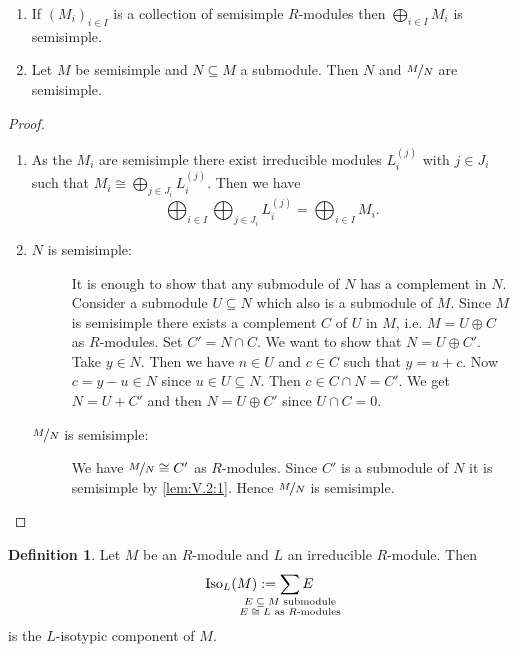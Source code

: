 \documentclass[12pt,a4paper]{scrartcl}
\theoremstyle{cplain}
\theoremstyle{cplain}
\theoremstyle{cplain}
\theoremstyle{definition}
\newtheorem*{deff}{Definition}
\begin{document}
\begin{otherlanguage}{english}
\begin{lem} \label{lem:V.2}
  \leavevmode
  \begin{enumerate}
    \item If $(M_i)_{i\in I}$ is a collection of semisimple $R$-modules then $\bigoplus_{i\in I}M_i$ is semisimple. \label{lem:V.2:1}
    \item Let $M$ be semisimple and $N\subseteq M$ a submodule. Then $N$ and $\nicefrac{M}{N}$ are semisimple. \label{lem:V.2:2}
  \end{enumerate}
\end{lem}
\begin{proof}
  \leavevmode
  \begin{enumerate}[label=\ref{lem:V.2:\arabic*}]
    \item As the $M_i$ are semisimple there exist irreducible modules $L_i^{(j)}$ with $j \in J_i$ such that $M_i \cong \bigoplus_{j\in J_i}L_i^{(j)}$. Then we have \[\bigoplus_{i\in I}\bigoplus_{j\in J_i}L_i^{(j)} = \bigoplus_{i\in I} M_i.\]
    
    \vspace{-1cm}
    \item \begin{description}
      \item[$N$ is semisimple:] It is enough to show that any submodule of $N$ has a complement in $N$. Consider a submodule $U\subseteq N$ which also is a submodule of $M$. Since $M$ is semisimple there exists a complement $C$ of $U$ in $M$, i.e. $M= U \oplus C$ as $R$-modules. Set $C' = N\cap C$. We want to show that $N=U \oplus C'$. Take $y \in N$. Then we have $n\in U$ and $c \in C$ such that $y=u+c$. Now $c = y-u\in N$ since $u\in U \subseteq N$. Then $c \in C \cap N = C'$. We get $N = U+C'$ and then $N=U\oplus C'$ since $U\cap C=0$.
      \item[$\nicefrac{M}{N}$ is semisimple:] We have $\nicefrac{M}{N} \cong C'$ as $R$-modules. Since $C'$ is a submodule of $N$ it is semisimple by \ref{lem:V.2:1}. Hence $\nicefrac{M}{N}$ is semisimple.
      \qedhere
    \end{description}
  \end{enumerate}
\end{proof}

\begin{deff}
  Let $M$ be an $R$-module and $L$ an irreducible $R$-module. Then \[\Iso_L(M) := \sum_{\mathclap{\substack{\text{$E \subseteq M$ submodule}\\\text{$E\cong L$ as $R$-modules}}}}E \] is the $L$-isotypic component of $M$.
\end{deff}


\end{otherlanguage}
\end{document}
